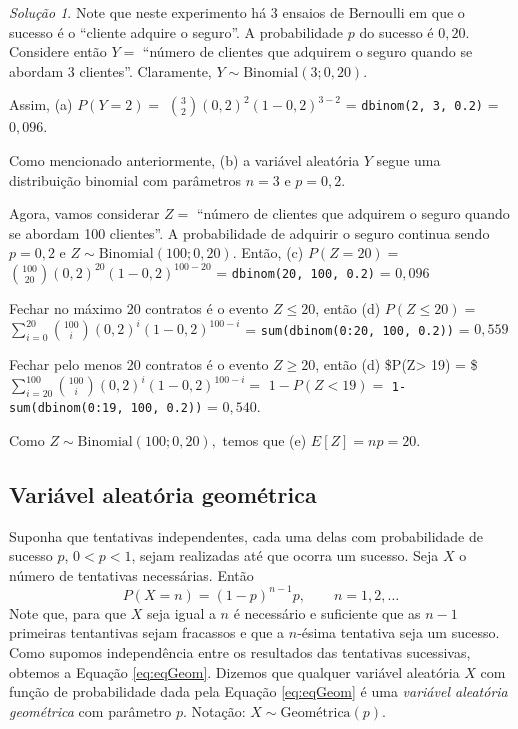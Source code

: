 \documentclass[]{book}
\theoremstyle{definition}
\theoremstyle{definition}
\theoremstyle{definition}
\theoremstyle{remark}
\newtheorem*{solution}{Solução}
\begin{document}
\begin{solution}
\iffalse{} {Solução. } \fi{}Note que neste experimento há 3 ensaios de Bernoulli em que o sucesso é o ``cliente adquire o seguro''.
A probabilidade \(p\) do sucesso é \(0,20\).
Considere então \(Y=\) ``número de clientes que adquirem o seguro quando se abordam 3 clientes''.
Claramente, \(Y\sim\mathrm{Binomial}(3; 0{,}20).\)

Assim, (a) \(P(Y=2) =\) \({3 \choose 2}(0{,}2)^2(1-0{,}2)^{3-2}\) = \texttt{dbinom(2,\ 3,\ 0.2)} = \(0{,}096\).

Como mencionado anteriormente, (b) a variável aleatória \(Y\) segue uma distribuição binomial com parâmetros \(n=3\) e \(p=0{,}2\).

Agora, vamos considerar \(Z=\) ``número de clientes que adquirem o seguro quando se abordam 100 clientes''.
A probabilidade de adquirir o seguro continua sendo \(p=0{,}2\) e \(Z\sim\mathrm{Binomial}(100; 0{,}20).\)
Então, (c) \(P(Z=20) =\) \({100 \choose 20}(0{,}2)^{20}(1-0{,}2)^{100-20}\) = \texttt{dbinom(20,\ 100,\ 0.2)} = \(0{,}096\)

Fechar no máximo 20 contratos é o evento \(Z \leq 20\), então (d) \(P(Z\leq 20) =\) \(\sum_{i=0}^{20}{100 \choose i}(0{,}2)^{i}(1-0{,}2)^{100-i}\) = \texttt{sum(dbinom(0:20,\ 100,\ 0.2))} = \(0{,}559\)

Fechar pelo menos 20 contratos é o evento \(Z \geq 20\), então (d) \$P(Z\textgreater{} 19) = \$ \(\sum_{i=20}^{100}{100 \choose i}(0{,}2)^{i}(1-0{,}2)^{100-i}=\) \(1-P(Z<19)=\) \texttt{1-sum(dbinom(0:19,\ 100,\ 0.2))} = \(0{,}540.\)

Como \(Z\sim\mathrm{Binomial}(100; 0{,}20),\) temos que (e) \(E[Z] = np = 20.\)
\end{solution}

\hypertarget{variuxe1vel-aleatuxf3ria-geomuxe9trica}{%
\subsection{Variável aleatória geométrica}\label{variuxe1vel-aleatuxf3ria-geomuxe9trica}}

Suponha que tentativas independentes, cada uma delas com probabilidade de sucesso \(p\), \(0<p<1\), sejam realizadas até que ocorra um sucesso.
Seja \(X\) o número de tentativas necessárias.
Então
\begin{equation}
P(X=n) = (1-p)^{n-1}p, \qquad n=1,2,\ldots
\label{eq:eqGeom}
\end{equation}
Note que, para que \(X\) seja igual a \(n\) é necessário e suficiente que as \(n-1\) primeiras tentantivas sejam fracassos e que a \(n\)-ésima tentativa seja um sucesso.
Como supomos independência entre os resultados das tentativas sucessivas, obtemos a Equação \eqref{eq:eqGeom}.
Dizemos que qualquer variável aleatória \(X\) com função de probabilidade dada pela Equação \eqref{eq:eqGeom} é uma \emph{variável aleatória geométrica} com parâmetro \(p\).
Notação: \(X\sim\mathrm{Geométrica}(p).\)
\end{document}
